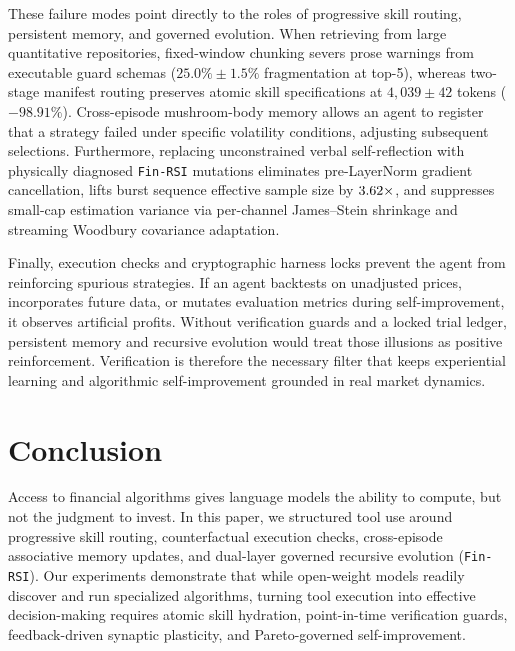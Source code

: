 \documentclass[11pt]{article}
\begin{document}
These failure modes point directly to the roles of progressive skill routing, persistent
memory, and governed evolution. When retrieving from large quantitative repositories,
fixed-window chunking severs prose warnings from executable guard schemas ($25.0\% \pm 1.5\%$
fragmentation at top-5), whereas two-stage manifest routing preserves atomic skill specifications
at $4{,}039 \pm 42$ tokens ($-98.91\%$). Cross-episode mushroom-body memory allows an
agent to register that a strategy failed under specific volatility conditions, adjusting
subsequent selections. Furthermore, replacing unconstrained verbal self-reflection with
physically diagnosed \texttt{Fin-RSI} mutations eliminates pre-LayerNorm gradient
cancellation, lifts burst sequence effective sample size by $3.62{}\times$,
and suppresses small-cap estimation variance via per-channel James--Stein shrinkage and
streaming Woodbury covariance adaptation.

Finally, execution checks and cryptographic harness locks prevent the agent from reinforcing
spurious strategies. If an agent backtests on unadjusted prices, incorporates future data, or
mutates evaluation metrics during self-improvement, it observes artificial profits. Without
verification guards and a locked trial ledger, persistent memory and recursive evolution would
treat those illusions as positive reinforcement. Verification is therefore the necessary filter
that keeps experiential learning and algorithmic self-improvement grounded in real market dynamics.

\section{Conclusion}
Access to financial algorithms gives language models the ability to compute, but not
the judgment to invest. In this paper, we structured tool use around progressive skill
routing, counterfactual execution checks, cross-episode associative memory updates, and
dual-layer governed recursive evolution (\texttt{Fin-RSI}). Our experiments demonstrate that
while open-weight models readily discover and run specialized algorithms, turning tool
execution into effective decision-making requires atomic skill hydration, point-in-time
verification guards, feedback-driven synaptic plasticity, and Pareto-governed self-improvement.

\clearpage
\end{document}
